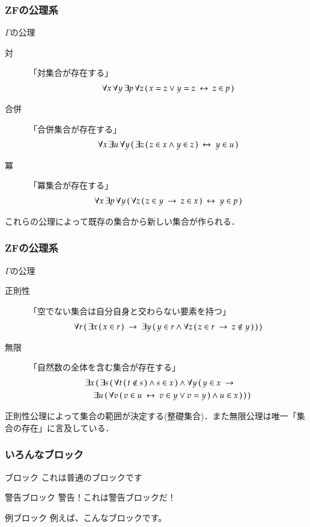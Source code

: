 \documentclass[dvipdfmx,10pt,notheorems]{beamer}
\theoremstyle{definition}
\newcommand{\rarrow}{\hspace{0.25em}\rightarrow\hspace{0.25em}} %
\newcommand{\lrarrow}{\hspace{0.25em}\leftrightarrow\hspace{0.25em}} %
\begin{document}
\begin{frame}\frametitle{{\bf ZF}の公理系}
	\begin{alertblock}{$\Gamma$の公理}
		\begin{description}
			\item[対] 「対集合が存在する」
				\begin{align}
					\forall x\, \forall y\, \exists p\, \forall z\, (\, x = z \vee y = z \lrarrow z \in p\, )
				\end{align}
			\item[合併] 「合併集合が存在する」
				\begin{align}
					\forall x\, \exists u\, \forall y\, (\, \exists z\, (\, z \in x \wedge y \in z\, ) \lrarrow y \in u\, )
				\end{align}
			\item[冪] 「冪集合が存在する」
				\begin{align}
					\forall x\, \exists p\, \forall y\, (\, \forall z\, (\, z \in y \rarrow z \in x\, ) \lrarrow y \in p\, )
				\end{align}
		\end{description}
	\end{alertblock}
	これらの公理によって既存の集合から新しい集合が作られる．
\end{frame}

\begin{frame}\frametitle{{\bf ZF}の公理系}
	\begin{alertblock}{$\Gamma$の公理}
		\begin{description}
			\item[正則性] 「空でない集合は自分自身と交わらない要素を持つ」
				\begin{align}
					\forall r\, (\, \exists x\, (\, x \in r\, ) \rarrow
					\exists y\, (\, y \in r \wedge \forall z\, (\, z \in r \rarrow
					z \notin y\, )\, )\, )
				\end{align}
			\item[無限] 「自然数の全体を含む集合が存在する」
				\begin{align}
					&\exists x\, (\, \exists s\, (\, \forall t\, (\, t \notin s\, ) \wedge s \in x\, ) 
					\wedge \forall y\, (\, y \in x \rarrow \\
					&\quad \exists u\, (\, \forall v\, (\, v \in u \lrarrow v \in y \vee v = y\, ) 
					\wedge u \in x\, )\, )\, )
				\end{align}
		\end{description}
	\end{alertblock}
	正則性公理によって集合の範囲が決定する(整礎集合)．また無限公理は唯一「集合の存在」に言及している．
\end{frame}

\begin{frame}\frametitle{いろんなブロック}
\begin{block}{ブロック}
これは普通のブロックです
\end{block}

\begin{alertblock}{警告ブロック}
警告！これは警告ブロックだ！
\end{alertblock}

\begin{exampleblock}{例ブロック}
例えば、こんなブロックです。
\end{exampleblock}
\end{frame}



\end{document}
